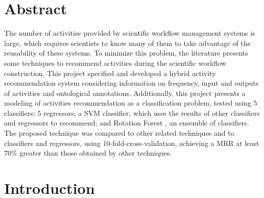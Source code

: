 \documentclass[10pt,letterpaper]{article}
\begin{document}
\section*{Abstract}
The number of activities provided by scientific workflow management systems is large,
which requires scientists to know many of them to take advantage of the reusability
of these systems. To minimize this problem, the literature presents some techniques to recommend activities during the scientific workflow construction. This project specified and developed a hybrid activity recommendation system considering information on frequency, input and outputs of activities and ontological annotations. Additionally, this project presents a modeling of activities recommendation as a classification problem, tested using \(5\) classifiers; \(5\) regressors; a SVM classifier, which uses the results of other classifiers and
regressors to recommend; and Rotation Forest , an ensemble of classifiers. The proposed technique was compared to other related techniques and to classifiers and regressors, using \(10\)-fold-cross-validation, achieving a MRR at least \(70\%\) greater than those obtained by other techniques.



\linenumbers

\section*{Introduction}
\end{document}
